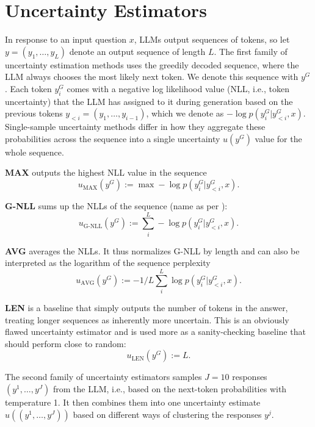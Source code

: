 \section{Uncertainty Estimators} \label{app:uq}

In response to an input question $x$, LLMs output sequences of tokens, so let $y = (y_1, \dotsc, y_L)$ denote an output sequence of length $L$. The first family of uncertainty estimation methods uses the greedily decoded sequence, where the LLM always chooses the most likely next token. We denote this sequence with $y^G$. Each token $y_i^G$ comes with a negative log likelihood value (NLL, i.e., token uncertainty) that the LLM has assigned to it during generation based on the previous tokens $y_{<i} = (y_1, \dots, y_{i-1})$, which we denote as $- \log p(y^G_i|y^G_{<i}, x)$. Single-sample uncertainty methods differ in how they aggregate these probabilities across the sequence into a single uncertainty $u(y^G)$ value for the whole sequence.

\textbf{MAX} outputs the highest NLL value in the sequence \begin{equation}
u_{\text{MAX}}(y^G) := \max -\log p(y^G_i|y^G_{<i}, x).\end{equation}

\textbf{G-NLL} sums up the NLLs of the sequence (name as per \citet{aichberger2024rethi}): 
\begin{equation}
\label{eq:G-NLL}
    u_{\text{G-NLL}}(y^G) := \sum_i^L -\log p(y^G_i|y^G_{<i}, x).
\end{equation}

\textbf{AVG} averages the NLLs. It thus normalizes G-NLL by length and can also be interpreted as the logarithm of the sequence perplexity \begin{equation}u_{\text{AVG}}(y^G) := -1/L \sum_i^L \log p(y^G_i|y^G_{<i}, x).\end{equation}

\textbf{LEN} is a baseline that simply outputs the number of tokens in the answer, treating longer sequences as inherently more uncertain. This is an obviously flawed uncertainty estimator and is used more as a sanity-checking baseline that should perform close to random: 
\begin{equation}u_{\text{LEN}}(y^G) := L.\end{equation}

The second family of uncertainty estimators samples $J=10$ responses $(y^1, \dots, y^J)$ from the LLM, i.e., based on the next-token probabilities with temperature 1. It then combines them into one uncertainty estimate $u((y^1, \dots, y^J))$ based on different ways of clustering the responses $y^j$.

